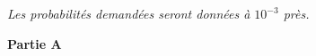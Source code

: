 
\medskip

\emph{Les probabilités demandées seront données à $10^{-3}$ près.}

%
%
%
%
%

\medskip

\textbf{Partie A}

\medskip

